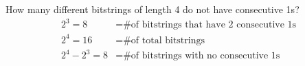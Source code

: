 \documentclass[letterpaper, 12pt]{article}
\newenvironment{example}[1][Example]{\begin{trivlist}
\item[\hskip \labelsep {\bfseries #1}]}{\end{trivlist}}
\newcommand{\0}{\emptyset}
\begin{document}
    \begin{example}
        How many different bitstrings of length 4 do not have consecutive 1s?
        \begin{align*}
            2^3 = 8 &= \text{\# of bitstrings that have 2 consecutive 1s} \\
            2^4 = 16 &= \text{\# of total bitstrings} \\
            2^4 - 2^3 = 8 &= \text{\# of bitstrings with no consecutive 1s}
        \end{align*}
    \end{example}
\end{document}

